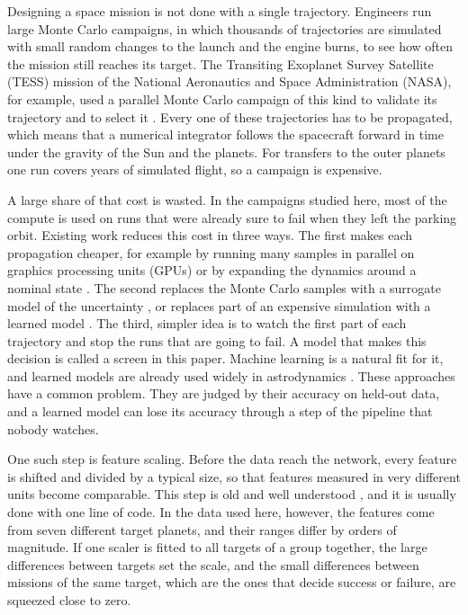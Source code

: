 Designing a space mission is not done with a single trajectory. Engineers run large Monte Carlo campaigns, in which thousands of trajectories are simulated with small random changes to the launch and the engine burns, to see how often the mission still reaches its target. The Transiting Exoplanet Survey Satellite (TESS) mission of the National Aeronautics and Space Administration (NASA), for example, used a parallel Monte Carlo campaign of this kind to validate its trajectory and to select it \cite{nickel2016}. Every one of these trajectories has to be propagated, which means that a numerical integrator follows the spacecraft forward in time under the gravity of the Sun and the planets. For transfers to the outer planets one run covers years of simulated flight, so a campaign is expensive.

A large share of that cost is wasted. In the campaigns studied here, most of the compute is used on runs that were already sure to fail when they left the parking orbit. Existing work reduces this cost in three ways. The first makes each propagation cheaper, for example by running many samples in parallel on graphics processing units (GPUs) or by expanding the dynamics around a nominal state \cite{massari2017}. The second replaces the Monte Carlo samples with a surrogate model of the uncertainty \cite{jia2022,balducci2017}, or replaces part of an expensive simulation with a learned model \cite{yin2022}. The third, simpler idea is to watch the first part of each trajectory and stop the runs that are going to fail. A model that makes this decision is called a screen in this paper. Machine learning is a natural fit for it, and learned models are already used widely in astrodynamics \cite{izzo2019survey,izzo2024}. These approaches have a common problem. They are judged by their accuracy on held-out data, and a learned model can lose its accuracy through a step of the pipeline that nobody watches.

One such step is feature scaling. Before the data reach the network, every feature is shifted and divided by a typical size, so that features measured in very different units become comparable. This step is old and well understood \cite{sola1997,huang2023}, and it is usually done with one line of code. In the data used here, however, the features come from seven different target planets, and their ranges differ by orders of magnitude. If one scaler is fitted to all targets of a group together, the large differences between targets set the scale, and the small differences between missions of the same target, which are the ones that decide success or failure, are squeezed close to zero.

